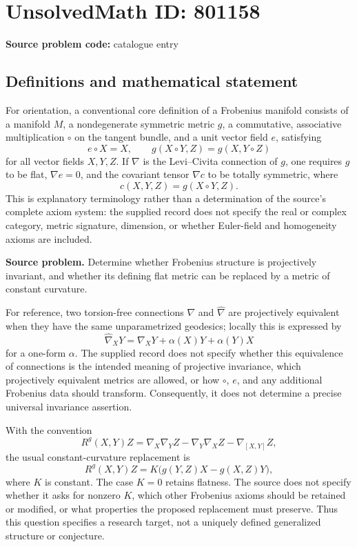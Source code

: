 \documentclass[11pt]{article}
\begin{document}
\section*{UnsolvedMath ID: 801158}
\textbf{Source problem code:} catalogue entry
\subsection{Definitions and mathematical statement}
For orientation, a conventional core definition of a Frobenius manifold consists of a manifold \(M\), a nondegenerate symmetric metric \(g\), a commutative, associative multiplication \(\circ\) on the tangent bundle, and a unit vector field \(e\), satisfying
\[
e\circ X=X,\qquad g(X\circ Y,Z)=g(X,Y\circ Z)
\]
for all vector fields \(X,Y,Z\). If \(\nabla\) is the Levi--Civita connection of \(g\), one requires \(g\) to be flat, \(\nabla e=0\), and the covariant tensor \(\nabla c\) to be totally symmetric, where
\[
c(X,Y,Z)=g(X\circ Y,Z).
\]
This is explanatory terminology rather than a determination of the source's complete axiom system: the supplied record does not specify the real or complex category, metric signature, dimension, or whether Euler-field and homogeneity axioms are included.

\textbf{Source problem.} Determine whether Frobenius structure is projectively invariant, and whether its defining flat metric can be replaced by a metric of constant curvature.

For reference, two torsion-free connections \(\nabla\) and \(\widehat\nabla\) are projectively equivalent when they have the same unparametrized geodesics; locally this is expressed by
\[
\widehat\nabla_XY=\nabla_XY+\alpha(X)Y+\alpha(Y)X
\]
for a one-form \(\alpha\). The supplied record does not specify whether this equivalence of connections is the intended meaning of projective invariance, which projectively equivalent metrics are allowed, or how \(\circ\), \(e\), and any additional Frobenius data should transform. Consequently, it does not determine a precise universal invariance assertion.

With the convention
\[
R^g(X,Y)Z=\nabla_X\nabla_YZ-\nabla_Y\nabla_XZ-\nabla_{[X,Y]}Z,
\]
the usual constant-curvature replacement is
\[
R^g(X,Y)Z=K\bigl(g(Y,Z)X-g(X,Z)Y\bigr),
\]
where \(K\) is constant. The case \(K=0\) retains flatness. The source does not specify whether it asks for nonzero \(K\), which other Frobenius axioms should be retained or modified, or what properties the proposed replacement must preserve. Thus this question specifies a research target, not a uniquely defined generalized structure or conjecture.
\end{document}

